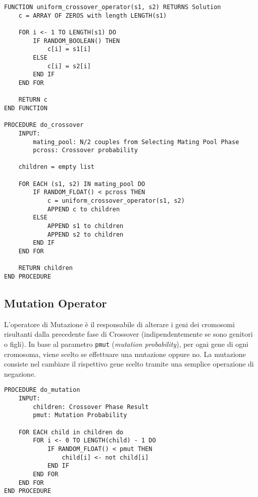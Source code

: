 \begin{minipage}{\textwidth}
    \begin{lstlisting}
FUNCTION uniform_crossover_operator(s1, s2) RETURNS Solution
    c = ARRAY OF ZEROS with length LENGTH(s1)

    FOR i <- 1 TO LENGTH(s1) DO
        IF RANDOM_BOOLEAN() THEN
            c[i] = s1[i]
        ELSE
            c[i] = s2[i]
        END IF
    END FOR

    RETURN c
END FUNCTION

PROCEDURE do_crossover
    INPUT:
        mating_pool: N/2 couples from Selecting Mating Pool Phase
        pcross: Crossover probability

    children = empty list

    FOR EACH (s1, s2) IN mating_pool DO
        IF RANDOM_FLOAT() < pcross THEN
            c = uniform_crossover_operator(s1, s2)
            APPEND c to children
        ELSE
            APPEND s1 to children
            APPEND s2 to children
        END IF
    END FOR

    RETURN children
END PROCEDURE
\end{lstlisting}
\end{minipage}

\subsection{Mutation Operator}

L'operatore di Mutazione è il responsabile di alterare i geni dei cromosomi
risultanti dalla precedente fase di Crossover (indipendentemente se sono
genitori o figli). In base al parametro \verb|pmut| (\textit{mutation
    probability}), per ogni gene di ogni cromosoma, viene scelto se effettuare una
mutazione oppure no. La mutazione consiste nel cambiare il rispettivo gene
scelto tramite una semplice operazione di negazione.

\begin{minipage}{\textwidth}
    \begin{lstlisting}
PROCEDURE do_mutation
    INPUT:
        children: Crossover Phase Result
        pmut: Mutation Probability

    FOR EACH child in children do
        FOR i <- 0 TO LENGTH(child) - 1 DO
            IF RANDOM_FLOAT() < pmut THEN
                child[i] <- not child[i]
            END IF
        END FOR
    END FOR
END PROCEDURE
\end{lstlisting}
\end{minipage}

